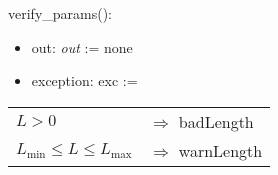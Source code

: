 \documentclass[12pt]{article}
\begin{document}
\noindent verify\_params():
\begin{itemize}
\item out: \textit{out} := none
\item exception: exc := 
\end{itemize}
\noindent \begin{longtable*}[l]{l l} 
$L > 0$ & $\Rightarrow$ badLength\\
$L_{\text{min}} \leq L \leq L_{\text{max}}$ & $\Rightarrow$ warnLength\\

\end{longtable*}
\end{document}
